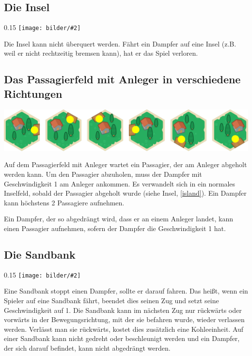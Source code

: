 \documentclass[12pt,a4paper, ngerman, oneside]{scrartcl}
\newcommand{\fieldGraphic}[2]{%
\begin{floatingfigure}[#1]{0.15\textwidth}%
  \centering
  \texttt{[image: bilder/\#2]}%
\end{floatingfigure}%
}
\begin{document}
\subsection{\label{island}Die Insel}

\fieldGraphic{r}{insel}

Die Insel kann nicht überquert werden. Fährt ein Dampfer auf eine Insel (z.B.
weil er nicht rechtzeitig bremsen kann), hat er das Spiel verloren.

\paragraph{}

\subsection{\label{passenger}Das Passagierfeld mit Anleger in verschiedene Richtungen}

\includegraphics[width=\textwidth]{bilder/passagier}

Auf dem Passagierfeld mit Anleger wartet ein Passagier, der am Anleger abgeholt
werden kann. Um den Passagier abzuholen, muss der Dampfer mit Geschwindigkeit 1
am Anleger ankommen. Es verwandelt sich in ein normales Inselfeld, sobald der
Passagier abgeholt wurde (siehe Insel, \ref{island}). Ein Dampfer kann höchstens
2 Passagiere aufnehmen.

Ein Dampfer, der so abgedrängt wird, dass er an einem Anleger landet, kann einen
Passagier aufnehmen, sofern der Dampfer die Geschwindigkeit 1 hat.


\subsection{\label{sandbank}Die Sandbank}

\fieldGraphic{r}{sandbank}

Eine Sandbank stoppt einen Dampfer, sollte er darauf fahren. Das heißt, wenn ein
Spieler auf eine Sandbank fährt, beendet dies seinen Zug und setzt seine
Geschwindigkeit auf 1. Die Sandbank kann im nächsten Zug nur rückwärts oder
vorwärts in der Bewegungsrichtung, mit der sie befahren wurde, wieder verlassen
werden. Verlässt man sie rückwärts, kostet dies zusätzlich eine Kohleeinheit. Auf
einer Sandbank kann nicht gedreht oder beschleunigt werden und ein Dampfer, der
sich darauf befindet, kann nicht abgedrängt werden.
\end{document}

